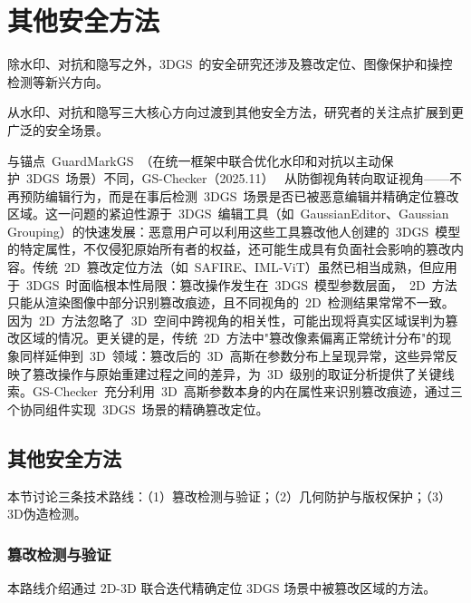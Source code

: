 

\section{其他安全方法}
\label{sec:21_4}

除水印、对抗和隐写之外，3DGS~的安全研究还涉及篡改定位、图像保护和操控检测等新兴方向。

从水印、对抗和隐写三大核心方向过渡到其他安全方法，研究者的关注点扩展到更广泛的安全场景。

与锚点~GuardMarkGS~（在统一框架中联合优化水印和对抗以主动保护~3DGS~场景）不同，GS-Checker（2025.11）~\cite{2511_20354} 从防御视角转向取证视角——不再预防编辑行为，而是在事后检测~3DGS~场景是否已被恶意编辑并精确定位篡改区域。这一问题的紧迫性源于~3DGS~编辑工具（如~GaussianEditor、Gaussian Grouping）的快速发展：恶意用户可以利用这些工具篡改他人创建的~3DGS~模型的特定属性，不仅侵犯原始所有者的权益，还可能生成具有负面社会影响的篡改内容。传统~2D~篡改定位方法（如~SAFIRE、IML-ViT）虽然已相当成熟，但应用于~3DGS~时面临根本性局限：篡改操作发生在~3DGS~模型参数层面，~2D~方法只能从渲染图像中部分识别篡改痕迹，且不同视角的~2D~检测结果常常不一致。因为~2D~方法忽略了~3D~空间中跨视角的相关性，可能出现将真实区域误判为篡改区域的情况。更关键的是，传统~2D~方法中"篡改像素偏离正常统计分布"的现象同样延伸到~3D~领域：篡改后的~3D~高斯在参数分布上呈现异常，这些异常反映了篡改操作与原始重建过程之间的差异，为~3D~级别的取证分析提供了关键线索。GS-Checker~充分利用~3D~高斯参数本身的内在属性来识别篡改痕迹，通过三个协同组件实现~3DGS~场景的精确篡改定位。

\subsection{其他安全方法}
\label{ss:21_4}

本节讨论三条技术路线：（1）篡改检测与验证；（2）几何防护与版权保护；（3）3D伪造检测。

\subsubsection{篡改检测与验证}

本路线介绍通过 2D-3D 联合迭代精确定位 3DGS 场景中被篡改区域的方法。


